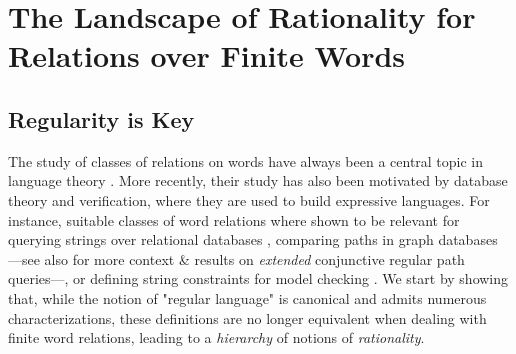 \section{The Landscape of Rationality for Relations over Finite Words}
\label{sec:preliminaries-automatic-structures-relations}

\subsection{Regularity is Key}
\label{sec:preliminaries-automatic-structures-relations-landscape}

The study of classes of relations on words have always been a central topic in language theory
\cite{ElgotMezi1965RelationsGeneralizedAutomata,Nivat1968TransductionChomsky,Berstel1979Transductions,FrougnySakarovitch1993SynchronizedRationalRelations,Choffrut2006Survey}. 
More recently, their study has also been motivated by database theory and verification,
where they are used to build expressive languages. For instance,
suitable classes of word relations where shown to be relevant for querying strings over relational 
databases \cite{BenediktLibkinSchwentickSegoufin2003DefinableRelations}, comparing paths in graph databases \cite{BarceloLibkinLinWood2012ExpressiveLanguages}---see also \cite[\S 8, p.~17]{Figueira2020Containment21FoundationsGraphPathQueryLanguages}
for more context \& results on \emph{extended} conjunctive regular path queries---, or defining string constraints for model checking \cite{LinBarcelo2016StringSolvingWordEquationsTransducers}. 
We start by showing that, while the notion of "regular language" is canonical and admits 
numerous characterizations, these definitions are no longer equivalent when dealing
with finite word relations, leading to a \emph{hierarchy} of notions of \emph{rationality}.

